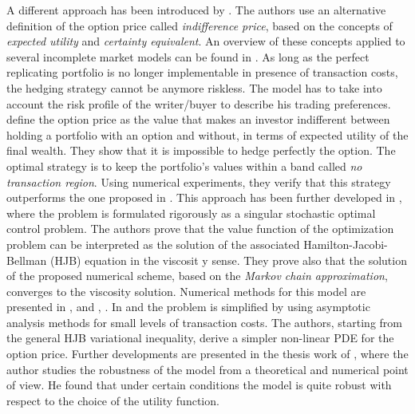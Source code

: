 A different approach has been introduced by \cite{HoNe89}. The authors use an alternative definition of the option price
called \emph{indifference price}, based on the concepts of \emph{expected utility} and \emph{certainty equivalent}.  
An overview of these concepts applied to several incomplete market models can be found in \cite{Carmona}.
As long as the perfect replicating portfolio is no longer implementable in presence of transaction costs, the 
hedging strategy cannot be anymore riskless. 
The model has to take into account the risk profile of the writer/buyer to describe his trading preferences.
\cite{HoNe89} define the option price as the value that makes an investor indifferent between holding a portfolio with an option
and without, in terms of expected utility of the final wealth.
They show that it is impossible to hedge perfectly the option. The optimal strategy is to keep the portfolio's values within
a band called \emph{no transaction region}. Using numerical experiments, they verify that this strategy outperforms the one 
proposed in \cite{Le85}.
This approach has been further developed in \cite{DaPaZa93}, where the problem is formulated rigorously as a singular 
stochastic optimal control problem. The authors prove that the value function of the optimization problem
can be interpreted as the solution of the associated Hamilton-Jacobi-Bellman (HJB) equation in the viscosit	y sense. 
They prove also that the solution of the proposed numerical scheme, based on the \emph{Markov chain approximation}, converges to the viscosity solution.
Numerical methods for this model are presented in \cite{DaPa94}, \cite{ClHo97} and \cite{Mon03}, \cite{Mon04}.
In \cite{WhWi97} and \cite{BaSo98} the problem is simplified by using asymptotic analysis methods for small levels of 
transaction costs. The authors, starting from the general HJB variational inequality, derive a simpler non-linear PDE for the option price. 
Further developments are presented in the thesis work of \cite{Damgaard}, where the author 
studies the robustness of the model from a theoretical and numerical point of view. 
He found that under certain conditions the model is quite robust with respect to the choice of the utility function. 

